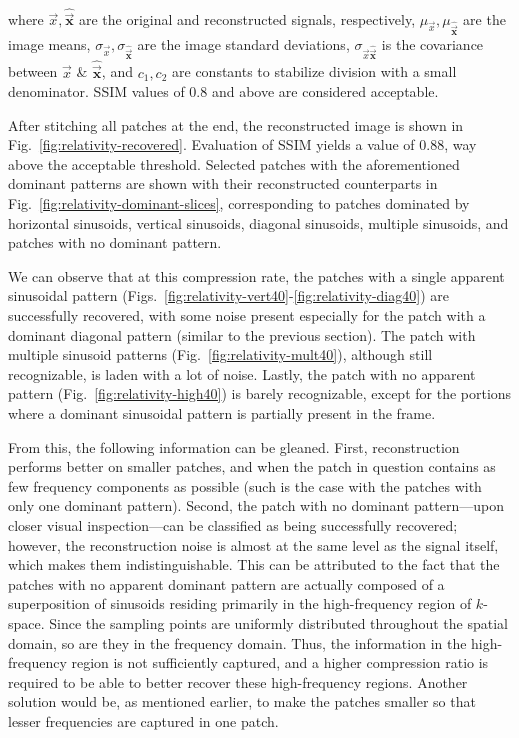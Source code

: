 \noindent where $\vec{x}, \bm\hat{\vec{x}}$ are the original and reconstructed signals, respectively, $\mu_{\vec{x}}, \mu_{\bm\hat{\vec{x}}}$ are the image means, $\sigma_{\vec{x}}, \sigma_{\bm\hat{\vec{x}}}$ are the image standard deviations, $\sigma_{\vec{x} \bm\hat{\vec{x}}}$ is the covariance between $\vec{x}$ \& $\bm\hat{\vec{x}}$, and $c_1, c_2$ are constants to stabilize division with a small denominator. SSIM values of 0.8 and above are considered acceptable.

After stitching all patches at the end, the reconstructed image is shown in Fig.~\ref{fig:relativity-recovered}. Evaluation of SSIM yields a value of 0.88, way above the acceptable threshold. Selected patches with the aforementioned dominant patterns are shown with their reconstructed counterparts in Fig.~\ref{fig:relativity-dominant-slices}, corresponding to patches dominated by horizontal sinusoids, vertical sinusoids, diagonal sinusoids, multiple sinusoids, and patches with no dominant pattern.

We can observe that at this compression rate, the patches with a single apparent sinusoidal pattern (Figs.~\ref{fig:relativity-vert40}-\ref{fig:relativity-diag40}) are successfully recovered, with some noise present especially for the patch with a dominant diagonal pattern (similar to the previous section). The patch with multiple sinusoid patterns (Fig.~\ref{fig:relativity-mult40}), although still recognizable, is laden with a lot of noise. Lastly, the patch with no apparent pattern (Fig.~\ref{fig:relativity-high40}) is barely recognizable, except for the portions where a dominant sinusoidal pattern is partially present in the frame.

From this, the following information can be gleaned. First, reconstruction performs better on smaller patches, and when the patch in question contains as few frequency components as possible (such is the case with the patches with only one dominant pattern). Second, the patch with no dominant pattern---upon closer visual inspection---can be classified as being successfully recovered; however, the reconstruction noise is almost at the same level as the signal itself, which makes them indistinguishable. This can be attributed to the fact that the patches with no apparent dominant pattern are actually composed of a superposition of sinusoids residing primarily in the high-frequency region of $k$-space. Since the sampling points are uniformly distributed throughout the spatial domain, so are they in the frequency domain. Thus, the information in the high-frequency region is not sufficiently captured, and a higher compression ratio is required to be able to better recover these high-frequency regions. Another solution would be, as mentioned earlier, to make the patches smaller so that lesser frequencies are captured in one patch.

